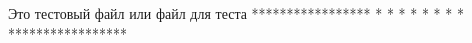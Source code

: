 Это тестовый файл
или файл для теста
*****************
*     *      *  *
*  *     *      *
*****************